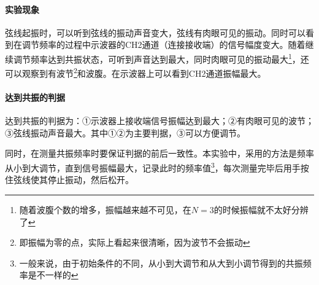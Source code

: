 \documentclass{ctexart}
\begin{document}
	\paragraph{实验现象}
	弦线起振时，可以听到弦线的振动声音变大，弦线有肉眼可见的振动。同时可以看到在调节频率的过程中示波器的CH2通道（连接接收端）的信号幅度变大。随着继续调节频率达到共振状态，可听到声音达到最大，同时肉眼可见的振动最大\footnote{随着波腹个数的增多，振幅越来越不可见，在$N=3$的时候振幅就不太好分辨了}，还可以观察到有波节\footnote{即振幅为零的点，实际上看起来很清晰，因为波节不会振动}和波腹。在示波器上可以看到CH2通道振幅最大。
	\paragraph{达到共振的判据}
	达到共振的判据为：①示波器上接收端信号振幅达到最大；②有肉眼可见的波节；③弦线振动声音最大。其中①②为主要判据，③可以方便调节。
	
	同时，在测量共振频率时要保证判据的前后一致性。本实验中，采用的方法是频率从小到大调节，直到信号振幅最大，记录此时的频率值\footnote{一般来说，由于初始条件的不同，从小到大调节和从大到小调节得到的共振频率是不一样的}，每次测量完毕后用手按住弦线使其停止振动，然后松开。
\end{document}
